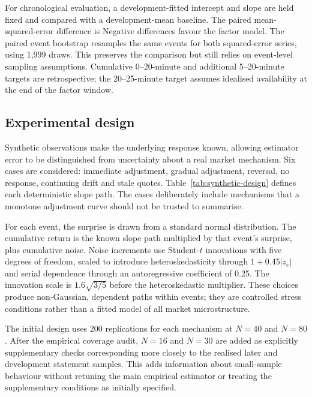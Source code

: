 For chronological evaluation, a development-fitted intercept and slope are held fixed and compared with a development-mean baseline. The paired mean-squared-error difference is
Negative differences favour the factor model. The paired event bootstrap resamples the same events for both squared-error series, using 1,999 draws. This preserves the comparison but still relies on event-level sampling assumptions. Cumulative 0--20-minute and additional 5--20-minute targets are retrospective; the 20--25-minute target assumes idealised availability at the end of the factor window.

\label{sec:synthetic}
\subsection{Experimental design}
Synthetic observations make the underlying response known, allowing estimator error to be distinguished from uncertainty about a real market mechanism. Six cases are considered: immediate adjustment, gradual adjustment, reversal, no response, continuing drift and stale quotes. Table~\ref{tab:synthetic-design} defines each deterministic slope path. The cases deliberately include mechanisms that a monotone adjustment curve should not be trusted to summarise.


For each event, the surprise is drawn from a standard normal distribution. The cumulative return is the known slope path multiplied by that event's surprise, plus cumulative noise. Noise increments use Student-$t$ innovations with five degrees of freedom, scaled to introduce heteroskedasticity through $1+0.45|z_e|$ and serial dependence through an autoregressive coefficient of 0.25. The innovation scale is $1.6\sqrt{3/5}$ before the heteroskedastic multiplier. These choices produce non-Gaussian, dependent paths within events; they are controlled stress conditions rather than a fitted model of all market microstructure.

The initial design uses 200 replications for each mechanism at $N=40$ and $N=80$. After the empirical coverage audit, $N=16$ and $N=30$ are added as explicitly supplementary checks corresponding more closely to the realised later and development statement samples. This adds information about small-sample behaviour without retuning the main empirical estimator or treating the supplementary conditions as initially specified.

